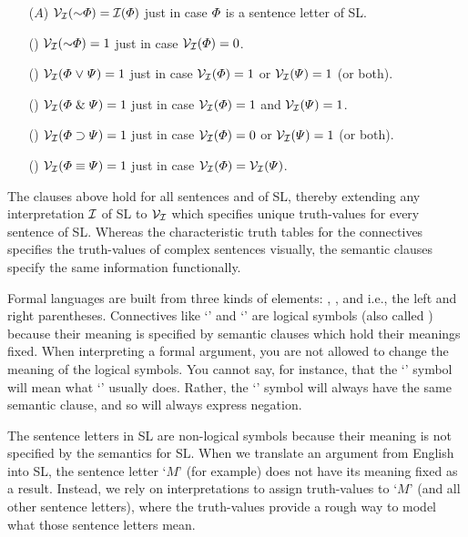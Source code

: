 \begin{enumerate}[labelsep=.15in]
  \item[($A$)] $\V{\I}(\enot\metaA{})=\I(\metaA{})$ just in case $\varPhi{}$ is a sentence letter of SL.
  \item[(\enot)] $\V{\I}(\enot\metaA{})=1$ just in case $\mathcal{V}_{\mathcal{I}}(\varPhi{})=0$.
  \item[(\eor)] $\mathcal{V}_{\mathcal{I}}(\varPhi{} \mkern1mu\vee\mkern1mu \varPsi{})=1$ just in case $\mathcal{V}_{\mathcal{I}}(\varPhi{})=1$ or $\mathcal{V}_{\mathcal{I}}(\varPsi{})=1$ (or both).
  \item[(\eand)] $\mathcal{V}_{\mathcal{I}}(\varPhi{} \mathrel\& \varPsi{})=1$ just in case $\mathcal{V}_{\mathcal{I}}(\varPhi{})=1$ and $\mathcal{V}_{\mathcal{I}}(\varPsi{})=1$.
  \item[(\eif)] $\mathcal{V}_{\mathcal{I}}(\varPhi{} \supset \varPsi{})=1$ just in case $\mathcal{V}_{\mathcal{I}}(\varPhi{})=0$ or $\mathcal{V}_{\mathcal{I}}(\varPsi{})=1$ (or both).
  \item[(\eiff)] $\mathcal{V}_{\mathcal{I}}(\varPhi{} \equiv \varPsi{})=1$ just in case $\mathcal{V}_{\mathcal{I}}(\varPhi{})=\mathcal{V}_{\mathcal{I}}(\varPsi{})$.
\end{enumerate}

The clauses above hold for all sentences \metaA{} and \metaB{} of SL, thereby extending any interpretation $\mathcal{I}$ of SL to $\mathcal{V}_{\mathcal{I}}$ which specifies unique truth-values for every sentence of SL.
Whereas the characteristic truth tables for the connectives specifies the truth-values of complex sentences visually, the semantic clauses specify the same information functionally.

Formal languages are built from three kinds of elements: , , and  i.e., the left and right parentheses.
Connectives like `\eand' and `\eif' are logical symbols (also called ) because their meaning is specified by semantic clauses which hold their meanings fixed.
When interpreting a formal argument, you are not allowed to change the meaning of the logical symbols.
You cannot say, for instance, that the `\enot' symbol will mean what `\eand' usually does.
Rather, the `\enot' symbol will always have the same semantic clause, and so will always express negation.

The sentence letters in SL are non-logical symbols because their meaning is not specified by the semantics for SL.
When we translate an argument from English into SL, the sentence letter `$M$' (for example) does not have its meaning fixed as a result.
Instead, we rely on interpretations to assign truth-values to `$M$' (and all other sentence letters), where the truth-values provide a rough way to model what those sentence letters mean.

